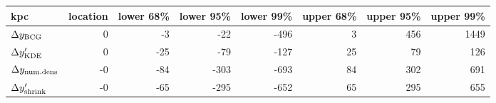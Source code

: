 \begin{tabular}{lrrrrrrr}
\toprule
kpc &  location &  lower 68\% &  lower 95\% &  lower 99\% &  upper 68\% &  upper 95\% &  upper 99\% \\
\midrule
$\Delta y_{\rm BCG}$       &         0 &          -3 &         -22 &        -496 &           3 &         456 &        1449 \\
$\Delta y_{\rm KDE}'$      &         0 &         -25 &         -79 &        -127 &          25 &          79 &         126 \\
$\Delta y_{\rm num. dens}$ &        -0 &         -84 &        -303 &        -693 &          84 &         302 &         691 \\
$\Delta y_{\rm shrink}'$   &        -0 &         -65 &        -295 &        -652 &          65 &         295 &         655 \\
\bottomrule
\end{tabular}

